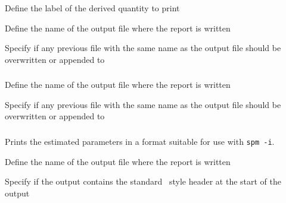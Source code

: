 \subsubsection[Print a derived quantity]{}

 {Define the label of the derived quantity to print}

 {Define the name of the output file where the report is written}

 {Specify if any previous file with the same name as the output file should be overwritten or appended to}

\subsubsection[Print a summary of the estimated parameters]{}

 {Define the name of the output file where the report is written}

 {Specify if any previous file with the same name as the output file should be overwritten or appended to}

\subsubsection[Printing the estimated parameter values out as a vector]{\label{sec:InputFileFormat}}

Prints the estimated parameters in a format suitable for use with \texttt{spm -i}.

 {Define the name of the output file where the report is written}

 {Specify if the output contains the standard \SPM\ style header at the start of the output}

